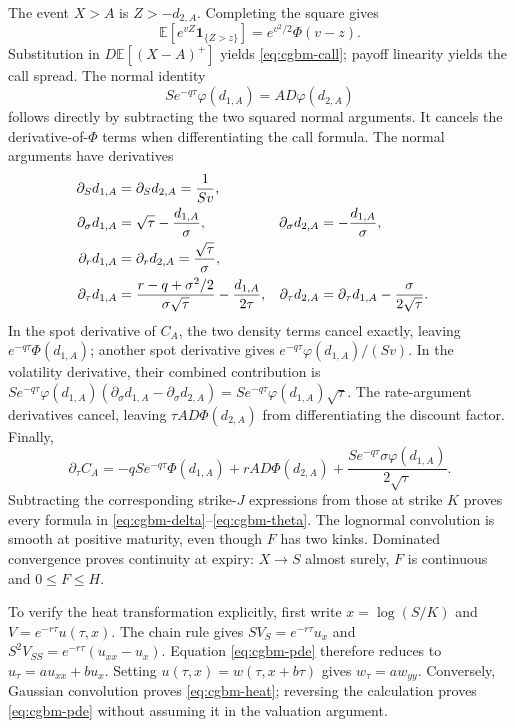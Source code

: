 \documentclass[11pt]{article}
\begin{document}
The event $X>A$ is $Z>-d_{2,A}$. Completing the square gives
\begin{equation}
 \mathbb E[e^{vZ}\mathbf 1_{\{Z>z\}}]
 =e^{v^2/2}\Phi(v-z).
 \label{eq:cgbm-gaussian-tilt}
\end{equation}
Substitution in $D\mathbb E[(X-A)^+]$ yields
\eqref{eq:cgbm-call}; payoff linearity yields the call spread. The normal
identity
\begin{equation}
 S e^{-q\tau}\varphi(d_{1,A})=A D\varphi(d_{2,A})
 \label{eq:cgbm-density-identity}
\end{equation}
follows directly by subtracting the two squared normal arguments. It
cancels the derivative-of-$\Phi$ terms when differentiating the call
formula. The normal arguments have derivatives
\begin{align}
 \partial_S d_{1,A}&=\partial_S d_{2,A}=\frac1{Sv},\notag\\
 \partial_\sigma d_{1,A}&=\sqrt{\tau}-\frac{d_{1,A}}{\sigma},
 &\partial_\sigma d_{2,A}&=-\frac{d_{1,A}}{\sigma},\notag\\
 \partial_r d_{1,A}&=\partial_r d_{2,A}=\frac{\sqrt{\tau}}{\sigma},
 \label{eq:cgbm-d-derivatives}\\
 \partial_\tau d_{1,A}&=
 \frac{r-q+\sigma^2/2}{\sigma\sqrt{\tau}}
 -\frac{d_{1,A}}{2\tau},
 &\partial_\tau d_{2,A}&=\partial_\tau d_{1,A}
 -\frac{\sigma}{2\sqrt{\tau}}.
 \notag
\end{align}
In the spot derivative of $C_A$, the two density terms cancel exactly,
leaving $e^{-q\tau}\Phi(d_{1,A})$; another spot derivative gives
$e^{-q\tau}\varphi(d_{1,A})/(Sv)$. In the volatility derivative, their
combined contribution is
$S e^{-q\tau}\varphi(d_{1,A})
(\partial_\sigma d_{1,A}-\partial_\sigma d_{2,A})
=S e^{-q\tau}\varphi(d_{1,A})\sqrt{\tau}$.
The rate-argument derivatives cancel, leaving
$\tau A D\Phi(d_{2,A})$ from differentiating the discount factor.
Finally,
\begin{equation}
 \partial_\tau C_A=-q S e^{-q\tau}\Phi(d_{1,A})
 +r A D\Phi(d_{2,A})
 +\frac{S e^{-q\tau}\sigma\varphi(d_{1,A})}{2\sqrt{\tau}}.
 \label{eq:cgbm-call-time}
\end{equation}
Subtracting the corresponding strike-$J$ expressions from those at
strike $K$ proves every formula in
\eqref{eq:cgbm-delta}--\eqref{eq:cgbm-theta}.
The lognormal convolution is smooth at positive maturity, even though
$F$ has two kinks. Dominated convergence proves continuity at expiry:
$X\to S$ almost surely, $F$ is continuous and $0\leq F\leq H$.

To verify the heat transformation explicitly, first write
$x=\log(S/K)$ and $V=e^{-r\tau}u(\tau,x)$. The chain rule gives
$SV_S=e^{-r\tau}u_x$ and
$S^2V_{SS}=e^{-r\tau}(u_{xx}-u_x)$. Equation
\eqref{eq:cgbm-pde} therefore reduces to
$u_\tau=a u_{xx}+b u_x$. Setting $u(\tau,x)=w(\tau,x+b\tau)$ gives
$w_\tau=a w_{yy}$. Conversely, Gaussian convolution proves
\eqref{eq:cgbm-heat}; reversing the calculation proves
\eqref{eq:cgbm-pde} without assuming it in the valuation argument.
\end{document}
